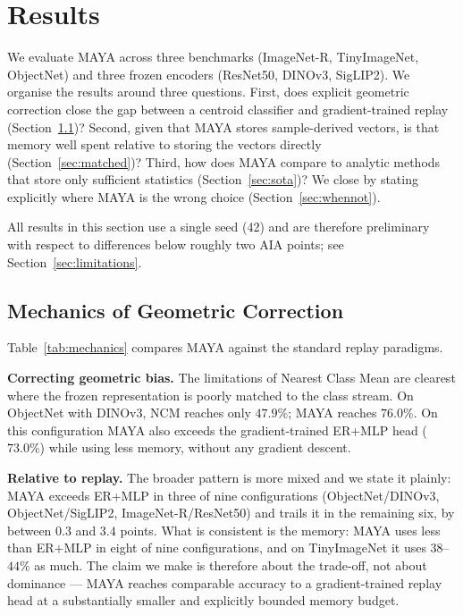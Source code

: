 \section{Results}
\label{sec:results}

We evaluate MAYA across three benchmarks (ImageNet-R, TinyImageNet, ObjectNet) and three frozen encoders (ResNet50, DINOv3, SigLIP2). We organise the results around three questions. First, does explicit geometric correction close the gap between a centroid classifier and gradient-trained replay (Section~\ref{sec:mechanics})? Second, given that MAYA stores sample-derived vectors, is that memory well spent relative to storing the vectors directly (Section~\ref{sec:matched})? Third, how does MAYA compare to analytic methods that store only sufficient statistics (Section~\ref{sec:sota})? We close by stating explicitly where MAYA is the wrong choice (Section~\ref{sec:whennot}).

All results in this section use a single seed (42) and are therefore preliminary with respect to differences below roughly two AIA points; see Section~\ref{sec:limitations}.

\subsection{Mechanics of Geometric Correction}
\label{sec:mechanics}

Table~\ref{tab:mechanics} compares MAYA against the standard replay paradigms.



\textbf{Correcting geometric bias.} The limitations of Nearest Class Mean are clearest where the frozen representation is poorly matched to the class stream. On ObjectNet with DINOv3, NCM reaches only $47.9\%$; MAYA reaches $76.0\%$. On this configuration MAYA also exceeds the gradient-trained ER+MLP head ($73.0\%$) while using less memory, without any gradient descent.

\textbf{Relative to replay.} The broader pattern is more mixed and we state it plainly: MAYA exceeds ER+MLP in three of nine configurations (ObjectNet/DINOv3, ObjectNet/SigLIP2, ImageNet-R/ResNet50) and trails it in the remaining six, by between $0.3$ and $3.4$ points. What is consistent is the memory: MAYA uses less than ER+MLP in eight of nine configurations, and on TinyImageNet it uses $38$--$44\%$ as much. The claim we make is therefore about the trade-off, not about dominance --- MAYA reaches comparable accuracy to a gradient-trained replay head at a substantially smaller and explicitly bounded memory budget.


